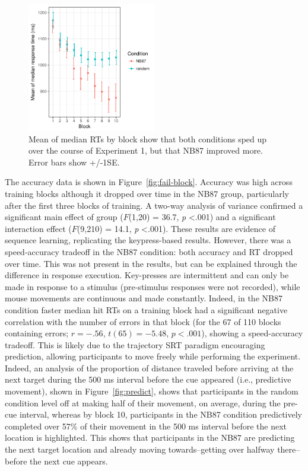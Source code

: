 \documentclass[man,floatsintext]{apa6}
\begin{document}
\begin{figure}[!h]
  \centering
  \includegraphics[width=0.5\textwidth]{figures/exp1_basic_RT_result}
  \caption{Mean of median RTs by block show that both conditions sped up over the course of Experiment 1, but that NB87 improved more. Error bars show +/-1SE.}
  \label{fig:basic-rt}
\end{figure} 

The accuracy data is shown in Figure~\ref{fig:fail-block}. Accuracy was high across training blocks although it dropped over time in the NB87 group, particularly after the first three blocks of training.  A two-way analysis of variance confirmed a significant main effect of group ($F$(1,20) = 36.7, \textit{p} \textless .001) and a significant interaction effect ($F$(9,210) = 14.1, \textit{p} \textless .001). These results are evidence of sequence learning, replicating the  keypress-based results. However, there was a speed-accuracy tradeoff in the NB87 condition: both accuracy and RT dropped over time. This was not present in the  results, but can be explained through the difference in response execution. Key-presses are intermittent and can only be made in response to a stimulus (pre-stimulus responses were not recorded), while mouse movements are continuous and made constantly. Indeed, in the NB87 condition faster median hit RTs on a training block had a significant negative correlation with the number of errors in that block (for the 67 of 110 blocks containing errors; $r=-.56$, $t(65)=-5.48$, $p<.001$), showing a speed-accuracy tradeoff. This is likely due to the trajectory SRT paradigm encouraging prediction, allowing participants to move freely while performing the experiment. Indeed, an analysis of the proportion of distance traveled before arriving at the next target during the 500 ms interval before the cue appeared (i.e., predictive movement), shown in Figure~\ref{fig:predict}, shows that participants in the random condition level off at making half of their movement, on average, during the pre-cue interval, whereas by block 10, participants in the NB87 condition predictively completed over 57\% of their movement in the 500 ms interval before the next location is highlighted. This shows that participants in the NB87 are predicting the next target location and already moving towards--getting over halfway there--before the next cue appears.
\end{document}
